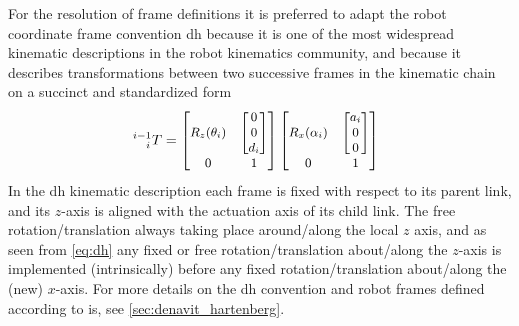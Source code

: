 For the resolution of frame definitions it is preferred to adapt the  robot coordinate frame convention \gls{dh} because it is one of the most widespread kinematic descriptions in the robot kinematics community, and because it describes transformations between two successive frames in the kinematic chain on a succinct and standardized form
\begin{equation}
\hspace*{-2mm}
\small
^{i-1}_{\phantom{-1}i} T =
\begin{bmatrix}
R_z(\theta_i) & \begin{bmatrix}0\\ 0\\ d_i\end{bmatrix}\\
0 & 1
\end{bmatrix}
\begin{bmatrix}
R_x(\alpha_i) & \begin{bmatrix}a_i\\ 0\\ 0\end{bmatrix}\\
0 & 1
\end{bmatrix}
\label{eq:dh}
\end{equation}
In the \gls{dh} kinematic description each frame is fixed with respect to its parent link, and its $z$-axis is aligned with the actuation axis of its child link. The free rotation/translation always taking place around/along the local $z$ axis, and as seen from \autoref{eq:dh} any fixed or free rotation/translation about/along the $z$-axis is implemented (intrinsically) before any fixed rotation/translation about/along the (new) $x$-axis. For more details on the \gls{dh} convention and robot frames defined according to is, see \autoref{sec:denavit_hartenberg}.


